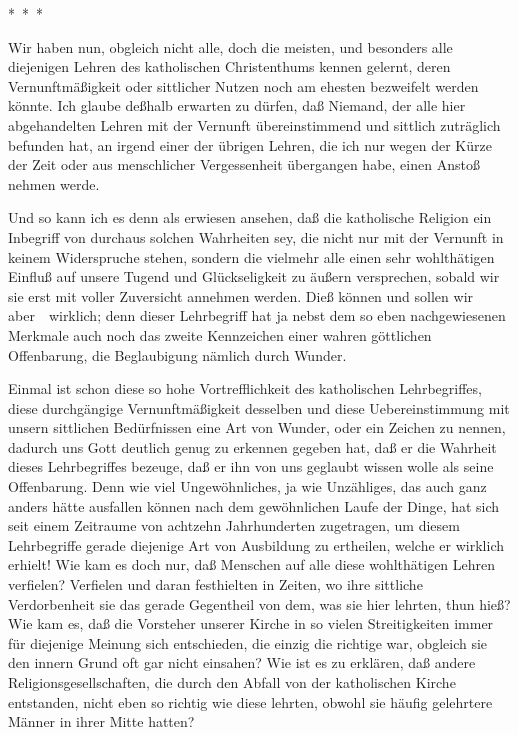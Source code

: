 \begin{center}*\ *\ *\end{center}

\begin{aufza}
\item Wir haben nun, obgleich nicht alle, doch die meisten, und besonders alle diejenigen Lehren des katholischen Christenthums kennen gelernt, deren Vernunftmäßigkeit oder sittlicher Nutzen noch am ehesten bezweifelt werden könnte. Ich glaube deßhalb erwarten zu dürfen, daß Niemand, der alle hier abgehandelten Lehren mit der Vernunft übereinstimmend und sittlich zuträglich befunden hat, an irgend einer der übrigen Lehren, die ich nur wegen der Kürze der Zeit oder aus menschlicher Vergessenheit übergangen habe, einen Anstoß nehmen werde.
\item Und so kann ich es denn als erwiesen ansehen, daß die katholische Religion ein Inbegriff von durchaus solchen Wahrheiten sey, die nicht nur mit der Vernunft in keinem Widerspruche stehen, sondern die vielmehr alle einen sehr wohlthätigen Einfluß auf unsere Tugend und Glückseligkeit zu äußern versprechen, sobald wir sie erst mit voller Zuversicht annehmen werden. Dieß können und sollen wir aber~\ wirklich; denn dieser Lehrbegriff hat ja nebst dem so eben nachgewiesenen  Merkmale auch noch das zweite  Kennzeichen einer wahren göttlichen Offenbarung, die Beglaubigung nämlich durch Wunder.
\item Einmal ist schon diese so hohe Vortrefflichkeit des katholischen Lehrbegriffes, diese durchgängige Vernunftmäßigkeit desselben und diese Uebereinstimmung mit unsern sittlichen Bedürfnissen eine Art von Wunder, oder ein Zeichen zu nennen, dadurch uns Gott deutlich genug zu erkennen gegeben hat, daß er die Wahrheit dieses Lehrbegriffes bezeuge, daß er ihn von uns geglaubt wissen wolle als seine Offenbarung. Denn wie viel Ungewöhnliches, ja wie Unzähliges, das auch ganz anders hätte ausfallen können nach dem gewöhnlichen Laufe der Dinge, hat sich seit einem Zeitraume von achtzehn Jahrhunderten zugetragen, um diesem Lehrbegriffe gerade diejenige Art von Ausbildung zu ertheilen, welche er wirklich erhielt! Wie kam es doch nur, daß Menschen auf alle diese wohlthätigen Lehren verfielen? Verfielen und daran festhielten in Zeiten, wo ihre sittliche Verdorbenheit sie das gerade Gegentheil von dem, was sie hier lehrten, thun hieß? Wie kam es, daß die Vorsteher unserer Kirche in so vielen Streitigkeiten immer für diejenige Meinung sich entschieden, die einzig die richtige war, obgleich sie den innern Grund oft gar nicht einsahen? Wie ist es zu erklären, daß andere Religionsgesellschaften, die durch den Abfall von der katholischen Kirche entstanden, nicht eben so richtig wie diese lehrten, obwohl sie häufig gelehrtere Männer in ihrer Mitte hatten? \usw\

\end{aufza}
